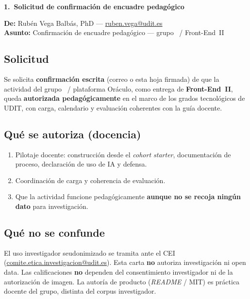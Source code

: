\documentclass[11pt,a4paper]{scrartcl}
\newcommand{\AnnexTitle}[1]{%
  \clearpage
  \LogoRow
  \begin{center}{\Large\sffamily\bfseries #1}\end{center}
  \vspace{0.4em}
  \noindent{\color{rulegray}\hrule height 0.4pt}
  \vspace{0.5em}
}
\begin{document}
\vspace{0.35em}
\DocsPrototypeNote

\vspace{0.45em}

\AnnexTitle{1.\ Solicitud de confirmación de encuadre pedagógico}

\noindent\textbf{De:} Rubén Vega Balbás, PhD ---
\href{mailto:ruben.vega@udit.es}{ruben.vega@udit.es}\\
\textbf{Asunto:} Confirmación de encuadre pedagógico --- grupo \TTODfull\ / Front-End~II

\subsection*{Solicitud}
Se solicita \textbf{confirmación escrita} (correo o esta hoja firmada) de que la
actividad del grupo \TTODfull\ / plataforma Oráculo, como entrega de
\textbf{Front-End~II}, queda \textbf{autorizada pedagógicamente} en el marco de los
grados tecnológicos de UDIT, con carga, calendario y evaluación coherentes con la
guía docente.

\subsection*{Qué se autoriza (docencia)}
\begin{enumerate}
  \item Pilotaje docente: construcción desde el \emph{cohort starter}, documentación
        de proceso, declaración de uso de IA y defensa.
  \item Coordinación de carga y coherencia de evaluación.
  \item Que la actividad funcione pedagógicamente \textbf{aunque no se recoja ningún
        dato} para investigación.
\end{enumerate}

\subsection*{Qué no se confunde}
El uso investigador seudonimizado se tramita ante el CEI
(\href{mailto:comite.etica.investigacion@udit.es}{comite.etica.investigacion@udit.es}).
Esta carta \textbf{no} autoriza investigación ni open data. Las calificaciones
\textbf{no} dependen del consentimiento investigador ni de la autorización de imagen.
La autoría de producto (\emph{README} / MIT) es práctica docente del grupo, distinta del
corpus investigador.
\end{document}
